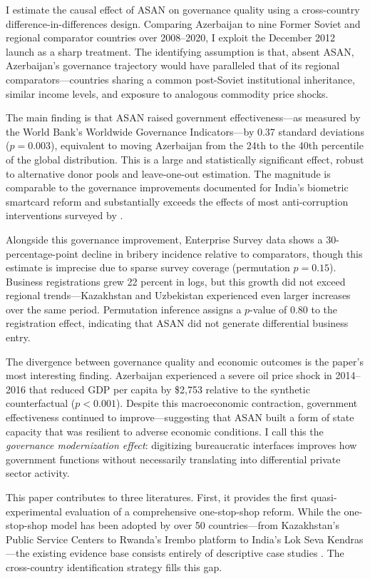 \documentclass[12pt]{article}
\begin{document}
I estimate the causal effect of ASAN on governance quality using a cross-country difference-in-differences design. Comparing Azerbaijan to nine Former Soviet and regional comparator countries over 2008--2020, I exploit the December 2012 launch as a sharp treatment. The identifying assumption is that, absent ASAN, Azerbaijan's governance trajectory would have paralleled that of its regional comparators---countries sharing a common post-Soviet institutional inheritance, similar income levels, and exposure to analogous commodity price shocks.

The main finding is that ASAN raised government effectiveness---as measured by the World Bank's Worldwide Governance Indicators---by 0.37 standard deviations ($p = 0.003$), equivalent to moving Azerbaijan from the 24th to the 40th percentile of the global distribution. This is a large and statistically significant effect, robust to alternative donor pools and leave-one-out estimation. The magnitude is comparable to the governance improvements documented for India's biometric smartcard reform \citep{muralidharan2016building} and substantially exceeds the effects of most anti-corruption interventions surveyed by \citet{olken2007monitoring}.

Alongside this governance improvement, Enterprise Survey data shows a 30-percentage-point decline in bribery incidence relative to comparators, though this estimate is imprecise due to sparse survey coverage (permutation $p = 0.15$). Business registrations grew 22 percent in logs, but this growth did not exceed regional trends---Kazakhstan and Uzbekistan experienced even larger increases over the same period. Permutation inference assigns a $p$-value of 0.80 to the registration effect, indicating that ASAN did not generate differential business entry.

The divergence between governance quality and economic outcomes is the paper's most interesting finding. Azerbaijan experienced a severe oil price shock in 2014--2016 that reduced GDP per capita by \$2,753 relative to the synthetic counterfactual ($p < 0.001$). Despite this macroeconomic contraction, government effectiveness continued to improve---suggesting that ASAN built a form of state capacity that was resilient to adverse economic conditions. I call this the \textit{governance modernization effect}: digitizing bureaucratic interfaces improves how government functions without necessarily translating into differential private sector activity.

This paper contributes to three literatures. First, it provides the first quasi-experimental evaluation of a comprehensive one-stop-shop reform. While the one-stop-shop model has been adopted by over 50 countries---from Kazakhstan's Public Service Centers to Rwanda's Irembo platform to India's Lok Seva Kendras---the existing evidence base consists entirely of descriptive case studies \citep{blavatnik2017asan, undesa2014egovernment}. The cross-country identification strategy fills this gap.
\end{document}
